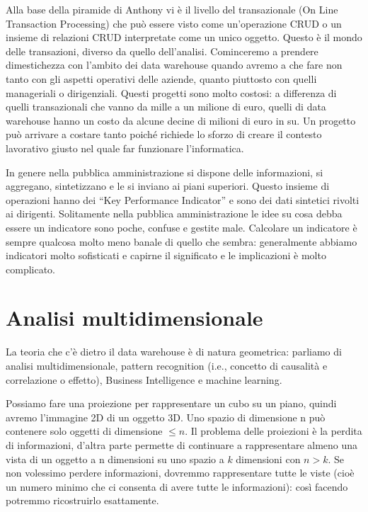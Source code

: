 Alla base della piramide di Anthony vi è il livello del transazionale (On Line Transaction Processing) che può essere visto come un’operazione CRUD o un insieme di relazioni CRUD interpretate come un unico oggetto. Questo è il mondo delle transazioni, diverso da quello dell’analisi. Cominceremo a prendere dimestichezza con l’ambito dei data warehouse quando avremo a che fare non tanto con gli aspetti operativi delle aziende, quanto piuttosto con quelli manageriali o dirigenziali. Questi progetti sono molto costosi: a differenza di quelli transazionali che vanno da mille a un milione di euro, quelli di data warehouse hanno un costo da alcune decine di milioni di euro in su. Un progetto può arrivare a costare tanto poiché richiede lo sforzo di creare il contesto lavorativo giusto nel quale far funzionare l’informatica.  

In genere nella pubblica amministrazione si dispone delle informazioni, si aggregano, sintetizzano e le si inviano ai piani superiori. Questo insieme di operazioni hanno dei “Key Performance Indicator” e sono dei dati sintetici rivolti ai dirigenti. Solitamente nella pubblica amministrazione le idee su cosa debba essere un indicatore sono poche, confuse e gestite male. Calcolare un indicatore è sempre qualcosa molto meno banale di quello che sembra: generalmente abbiamo indicatori molto sofisticati e capirne il significato e le implicazioni è molto complicato. 


\section{Analisi multidimensionale}

La teoria che c’è dietro il data warehouse è di natura geometrica: parliamo di analisi 
multidimensionale, pattern recognition (i.e., concetto di causalità e correlazione o effetto), Business Intelligence e machine learning. 

Possiamo fare una proiezione per rappresentare un cubo su un piano, quindi avremo l’immagine 2D di un oggetto 3D. Uno spazio di dimensione n può contenere solo oggetti di dimensione $\leq n$. Il problema delle proiezioni è la perdita di informazioni, d’altra parte permette di continuare a rappresentare almeno una vista di un oggetto a n dimensioni su uno spazio a $k$ dimensioni con $n > k$. Se non volessimo perdere informazioni, dovremmo rappresentare tutte le viste (cioè un numero minimo che ci consenta di avere tutte le informazioni): così facendo potremmo ricostruirlo esattamente. 

